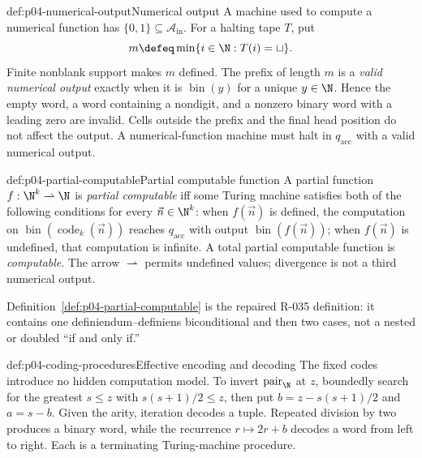\begin{hbconvention}{def:p04-numerical-output}{Numerical output}
A machine used to compute a numerical function has
\(\{0,1\}\subseteq\mathcal A_{\mathrm{in}}\).  For a halting tape \(T\), put
\[
  m\defeq\min\{i\in\N:T(i)=\sqcup\}.
\]
Finite nonblank support makes \(m\) defined.  The prefix of length \(m\)
is a \emph{valid numerical output} exactly when it is
\(\operatorname{bin}(y)\) for a unique \(y\in\N\).  Hence the empty word,
a word containing a nondigit, and a nonzero binary word with a leading zero
are invalid.  Cells outside the prefix and the final head position do not
affect the output.  A numerical-function machine must halt in
\(q_{\mathrm{acc}}\) with a valid numerical output.
\end{hbconvention}

\begin{hbdefinition}{def:p04-partial-computable}{Partial computable function}
A partial function \(f:\N^k\rightharpoonup\N\) is \emph{partial
computable} iff some Turing machine satisfies both of the following conditions
for every \(\vec n\in\N^k\): when \(f(\vec n)\) is defined, the computation
on \(\operatorname{bin}(\operatorname{code}_k(\vec n))\) reaches
\(q_{\mathrm{acc}}\) with output
\(\operatorname{bin}(f(\vec n))\); when \(f(\vec n)\) is undefined, that
computation is infinite.  A total partial computable function is
\emph{computable}.  The arrow \(\rightharpoonup\) permits undefined values;
divergence is not a third numerical output.
\end{hbdefinition}

Definition~\ref{def:p04-partial-computable} is the repaired R-035 definition:
it contains one definiendum--definiens biconditional and then two cases, not a
nested or doubled ``if and only if.''

\begin{hbmethod}{def:p04-coding-procedures}{Effective encoding and decoding}
The fixed codes introduce no hidden computation model.  To invert
\(\operatorname{pair}_{\N}\) at \(z\), boundedly search for the greatest
\(s\le z\) with \(s(s+1)/2\le z\), then put
\(b=z-s(s+1)/2\) and \(a=s-b\).  Given the arity, iteration decodes a tuple.
Repeated division by two produces a binary word, while the recurrence
\(r\mapsto2r+b\) decodes a word from left to right.  Each is a terminating
Turing-machine procedure.
\end{hbmethod}

